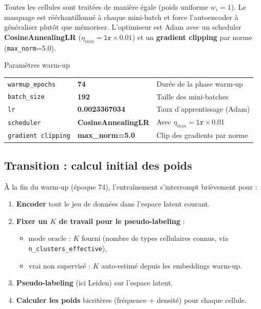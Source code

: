 \documentclass[11pt,a4paper]{article}
\begin{document}
Toutes les cellules sont trait\'ees de mani\`ere \'egale (poids uniforme $w_i = 1$). Le masquage est r\'e\'echantillonn\'e \`a chaque mini-batch et force l'autoencoder \`a g\'en\'eraliser plut\^ot que m\'emoriser. L'optimiseur est Adam avec un scheduler \textbf{CosineAnnealingLR} ($\eta_{min} = \texttt{lr} \times 0.01$) et un \textbf{gradient clipping} par norme (\texttt{max\_norm}=5.0).

\begin{parambox}{Param\`etres warm-up}
\begin{tabular}{lll}
\texttt{warmup\_epochs} & \textbf{74} & Dur\'ee de la phase warm-up \\
\texttt{batch\_size} & \textbf{192} & Taille des mini-batches \\
\texttt{lr} & \textbf{0.0023367034} & Taux d'apprentissage (Adam) \\
\texttt{scheduler} & \textbf{CosineAnnealingLR} & Avec $\eta_{min} = \texttt{lr} \times 0.01$ \\
\texttt{gradient clipping} & \textbf{max\_norm=5.0} & Clip des gradients par norme \\
\end{tabular}
\end{parambox}

\subsection{Transition : calcul initial des poids}
\label{sec:transition}

\`A la fin du warm-up (\'epoque 74), l'entra\^inement s'interrompt bri\`evement pour :
\begin{enumerate}[nosep]
  \item \textbf{Encoder} tout le jeu de donn\'ees dans l'espace latent courant.
  \item \textbf{Fixer un $K$ de travail pour le pseudo-labeling} :
  \begin{itemize}[nosep]
    \item mode oracle : $K$ fourni (nombre de types cellulaires connus, via \texttt{n\_clusters\_effective}),
    \item vrai non supervis\'e : $K$ auto-estim\'e depuis les embeddings warm-up.
  \end{itemize}
  \item \textbf{Pseudo-labeling} (ici Leiden) sur l'espace latent.
  \item \textbf{Calculer les poids} bicrit\`eres (fr\'equence + densit\'e) pour chaque cellule.
\end{enumerate}
\end{document}
